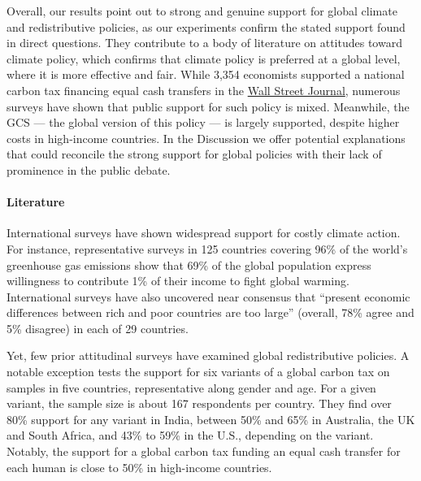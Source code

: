 \documentclass[12pt,english]{article}
\begin{document}
Overall, our results %
point out to strong and genuine support for global climate and redistributive policies, as our experiments confirm the stated support found in direct questions. 
They contribute to a body of literature on attitudes toward climate policy, which confirms that climate policy is preferred at a global level,\citep{issp_international_2010,beiser-mcgrath_could_2019,sivonen_attitudes_2022,meilland_international_2024} where it is more effective and fair. 
While 3,354 economists supported a national carbon tax financing equal cash transfers in the \href{https://www.clcouncil.org/media/EconomistsStatement.pdf}{Wall Street Journal}, numerous surveys have shown that public support for such policy is mixed.\citep{douenne_yellow_2022,dechezlepretre_fighting_nodate,carattini_overcoming_2018,maestre-andres_perceived_2019,mildenberger_limited_2022,sommer_supporting_2022} Meanwhile, the GCS --- the global version of this policy --- is largely supported, despite higher costs in high-income countries. 
In the Discussion we offer potential explanations that could reconcile the strong support for global policies with their lack of prominence in the public debate. %
\paragraph{Literature} 

International surveys have shown widespread support for costly climate action.\citep{dechezlepretre_fighting_nodate,leiserowitz_international_2022} For instance, representative surveys in 125 countries covering 96\% of the world's greenhouse gas emissions show that 69\% of the global population express willingness to contribute 1\% of their income to fight global warming.\cite{andre_globally_2024} International surveys have also uncovered near consensus that ``present economic differences between rich and poor countries are too large'' (overall, 78\% agree and 5\% disagree) in each of 29 countries.\citep{issp_international_2019} 

Yet, few prior attitudinal surveys have examined global redistributive policies. 
A notable exception tests the support for six variants of a global carbon tax on samples in five countries, representative along gender and age.\cite{carattini_how_2019} For a given variant, the sample size is about 167 respondents per country. They find over 80\% support for any variant in India, between 50\% and 65\% in Australia, the UK and South Africa, and 43\% to 59\% in the U.S., depending on the variant. Notably, the support for a global carbon tax funding an equal cash transfer for each human is close to 50\% in high-income countries. %
\end{document}
